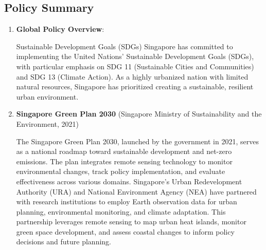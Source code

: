 \documentclass[
  letterpaper,
  DIV=11,
  numbers=noendperiod]{scrreprt}
\begin{document}
\subsection{Policy Summary}\label{policy-summary}

\begin{enumerate}
\def\labelenumi{\arabic{enumi}.}
\item
  \textbf{Global Policy Overview}:

  Sustainable Development Goals (SDGs) Singapore has committed to
  implementing the United Nations' Sustainable Development Goals (SDGs),
  with particular emphasis on SDG 11 (Sustainable Cities and
  Communities) and SDG 13 (Climate Action). As a highly urbanized nation
  with limited natural resources, Singapore has prioritized creating a
  sustainable, resilient urban environment.
\item
  \textbf{Singapore Green Plan 2030} (Singapore Ministry of
  Sustainability and the Environment, 2021)

  The Singapore Green Plan 2030, launched by the government in 2021,
  serves as a national roadmap toward sustainable development and
  net-zero emissions. The plan integrates remote sensing technology to
  monitor environmental changes, track policy implementation, and
  evaluate effectiveness across various domains. Singapore's Urban
  Redevelopment Authority (URA) and National Environment Agency (NEA)
  have partnered with research institutions to employ Earth observation
  data for urban planning, environmental monitoring, and climate
  adaptation. This partnership leverages remote sensing to map urban
  heat islands, monitor green space development, and assess coastal
  changes to inform policy decisions and future planning.


\end{enumerate}
\end{document}
